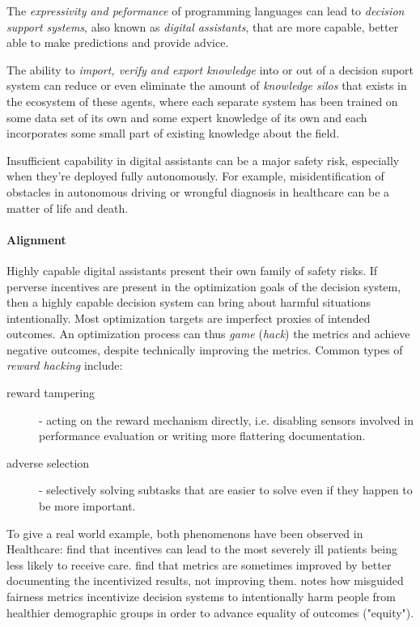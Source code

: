 The \emph{expressivity and peformance} of programming languages can lead to \emph{decision support systems}, also known as \emph{digital assistants}, that are more capable, better able to make predictions and provide advice.

The ability to \emph{import, verify and export knowledge} into or out of a decision suport system can reduce or even eliminate the amount of \emph{knowledge silos} that exists in the ecosystem of these agents, where each separate system has been trained on some data set of its own and some expert knowledge of its own and each incorporates some small part of existing knowledge about the field. 

Insufficient capability in digital assistants can be a major safety risk, especially when they're deployed fully autonomously. For example, misidentification of obstacles in autonomous driving \cite{sheebajoiceObstacleDetectionSafe2023} or wrongful diagnosis in healthcare \cite{wintersDiagnosticErrorsIntensive2012} can be a matter of life and death.

\paragraph{Alignment}

Highly capable digital assistants present their own family of safety risks. 
If perverse incentives are present in the optimization goals of the decision system, then a highly capable decision system can bring about harmful situations intentionally.
Most optimization targets are imperfect proxies of intended outcomes. 
An optimization process can thus \emph{game} (\emph{hack}) the metrics and achieve negative outcomes, despite technically improving the metrics.
Common types of \emph{reward hacking} \cite{skalseDefiningCharacterizingReward2022} include:
\begin{description}
    \item[reward tampering] \cite{everittRewardTamperingProblems2021, skalseInvariancePolicyOptimisation2023} - acting on the reward mechanism directly, i.e. disabling sensors involved in performance evaluation or writing more flattering documentation.
    \item[adverse selection] - selectively solving subtasks that are easier to solve even if they happen to be more important.
\end{description}

To give a real world example, both phenomenons have been observed in Healthcare: \cite{shenSelectionIncentivesPerformance2003} find that incentives can lead to the most severely ill patients being less likely to receive care. \cite{fairbrotherImpactFinancialIncentives2001, ImpactPhysicianBonuses, roskiImpactFinancialIncentives2003} find that metrics are sometimes improved by better documenting the incentivized results, not improving them.
\cite{longFairnessMachineLearning2021} notes how misguided fairness metrics incentivize decision systems to intentionally harm people from healthier demographic groups in order to advance equality of outcomes ("equity").

